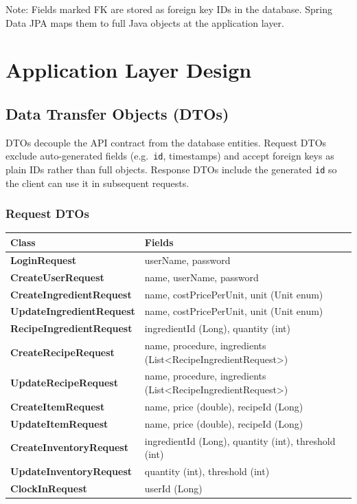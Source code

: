 \documentclass[12pt]{article}
\newcommand{\headerrow}{\rowcolor{darkblue}\color{white}\bfseries}
\begin{document}
\vspace{1em}
\textcolor{midgray}{\small Note: Fields marked FK are stored as foreign key IDs in the database.
Spring Data JPA maps them to full Java objects at the application layer.}

\newpage

\section{Application Layer Design}

\subsection{Data Transfer Objects (DTOs)}

DTOs decouple the API contract from the database entities. Request DTOs exclude auto-generated
fields (e.g.\ \texttt{id}, timestamps) and accept foreign keys as plain IDs rather than full
objects. Response DTOs include the generated \texttt{id} so the client can use it in subsequent
requests.

\subsubsection*{Request DTOs}

\begin{longtable}{>{\bfseries\ttfamily}p{5.2cm} p{8cm}}
\toprule
\headerrow Class & Fields \\
\midrule
\endhead
\rowcolor{lightgray} LoginRequest & userName, password \\
CreateUserRequest & name, userName, password \\
\rowcolor{lightgray} CreateIngredientRequest & name, costPricePerUnit, unit (Unit enum) \\
UpdateIngredientRequest & name, costPricePerUnit, unit (Unit enum) \\
\rowcolor{lightgray} RecipeIngredientRequest & ingredientId (Long), quantity (int) \\
CreateRecipeRequest & name, procedure, ingredients (List\textless RecipeIngredientRequest\textgreater) \\
\rowcolor{lightgray} UpdateRecipeRequest & name, procedure, ingredients (List\textless RecipeIngredientRequest\textgreater) \\
CreateItemRequest & name, price (double), recipeId (Long) \\
\rowcolor{lightgray} UpdateItemRequest & name, price (double), recipeId (Long) \\
CreateInventoryRequest & ingredientId (Long), quantity (int), threshold (int) \\
\rowcolor{lightgray} UpdateInventoryRequest & quantity (int), threshold (int) \\
ClockInRequest & userId (Long) \\
\bottomrule
\end{longtable}
\end{document}
